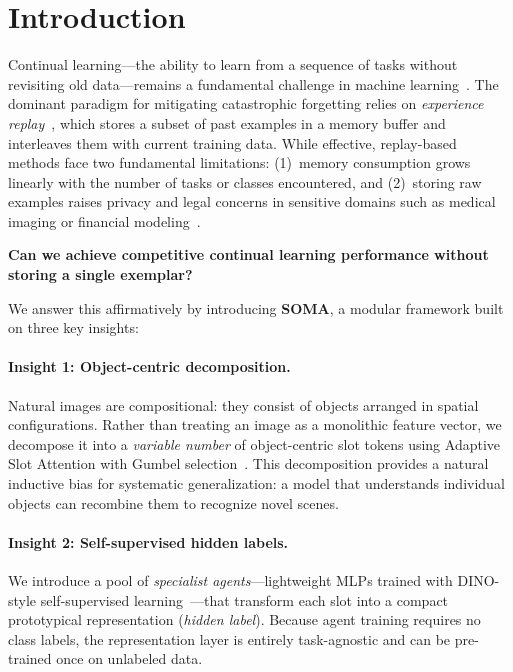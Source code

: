 \documentclass{article}
\begin{document}
\section{Introduction}
\label{sec:intro}

Continual learning---the ability to learn from a sequence of tasks without revisiting old data---remains a fundamental challenge in machine learning~\citep{parisi2019continual, wang2024comprehensive}.
The dominant paradigm for mitigating catastrophic forgetting relies on \textit{experience replay}~\citep{chaudhry2019tiny, buzzega2020dark}, which stores a subset of past examples in a memory buffer and interleaves them with current training data.
While effective, replay-based methods face two fundamental limitations:
(1)~memory consumption grows linearly with the number of tasks or classes encountered, and
(2)~storing raw examples raises privacy and legal concerns in sensitive domains such as medical imaging or financial modeling~\citep{lesort2020continual}.

\textbf{Can we achieve competitive continual learning performance without storing a single exemplar?}

We answer this affirmatively by introducing \textbf{SOMA}, a modular framework built on three key insights:

\paragraph{Insight 1: Object-centric decomposition.}
Natural images are compositional: they consist of objects arranged in spatial configurations.
Rather than treating an image as a monolithic feature vector, we decompose it into a \textit{variable number} of object-centric slot tokens using Adaptive Slot Attention with Gumbel selection~\citep{fan2024adaptive, locatello2020object}.
This decomposition provides a natural inductive bias for systematic generalization: a model that understands individual objects can recombine them to recognize novel scenes.

\paragraph{Insight 2: Self-supervised hidden labels.}
We introduce a pool of \textit{specialist agents}---lightweight MLPs trained with DINO-style self-supervised learning~\citep{caron2021emerging, oquab2024dinov2}---that transform each slot into a compact prototypical representation (\textit{hidden label}).
Because agent training requires no class labels, the representation layer is entirely task-agnostic and can be pre-trained once on unlabeled data.
\end{document}
